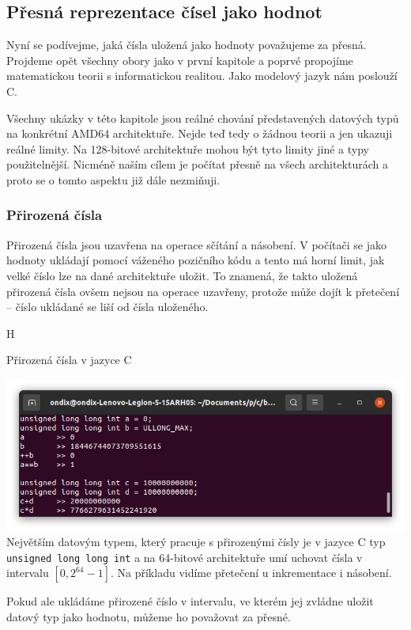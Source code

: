 \subsection{Přesná reprezentace čísel jako hodnot}
Nyní se podívejme, jaká čísla uložená jako hodnoty považujeme za přesná. Projdeme opět všechny obory jako v první kapitole a poprvé propojíme matematickou teorii s informatickou realitou. Jako modelový jazyk nám poslouží C.

Všechny ukázky v této kapitole jsou reálné chování představených datových typů na konkrétní AMD64 architektuře. Nejde teď tedy o žádnou teorii a jen ukazuji reálné limity. Na 128-bitové architektuře mohou být tyto limity jiné a typy použitelnější. Nicméně naším cílem je počítat přesně na všech architekturách a proto se o tomto aspektu již dále nezmiňuji.

\subsubsection{Přirozená čísla}
Přirozená čísla jsou uzavřena na operace sčítání a násobení. V počítači se jako hodnoty ukládají pomocí váženého pozičního kódu a tento má horní limit, jak velké číslo lze na dané architektuře uložit. To znamená, že takto uložená přirozená čísla ovšem nejsou na operace uzavřeny, protože může dojít k přetečení -- číslo ukládané se liší od čísla uloženého.

\begin{myfigure}{H}
\caption{Přirozená čísla v jazyce C}
\includegraphics[width=\linewidth]{./graphics/uinty.png}\label{obr:uinty}
Největším datovým typem, který pracuje s přirozenými čísly je v jazyce C typ \texttt{unsigned long long int} a na 64-bitové architektuře umí uchovat čísla v intervalu $[0, 2^{64}-1]$. Na příkladu vidíme přetečení u inkrementace i násobení.
\end{myfigure}

Pokud ale ukládáme přirozené číslo v intervalu, ve kterém jej zvládne uložit datový typ jako hodnotu, můžeme ho považovat za přesné.

